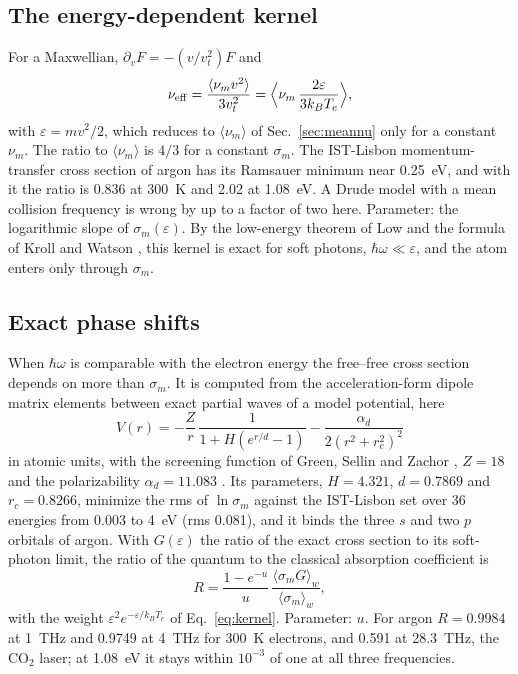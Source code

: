 \documentclass[11pt]{article}
\numberwithin{equation}{section}
\newcommand{\kB}{k_B}
\newcommand{\nueff}{\nu_{\rm eff}}
\begin{document}
\subsection{The energy-dependent kernel}
\label{sec:kernel}
For a Maxwellian, $\partial_vF=-(v/v_t^2)F$ and
\begin{equation}
\nueff=\frac{\langle\nu_mv^2\rangle}{3v_t^2}=\Big\langle\nu_m\,\frac{2\varepsilon}{3\kB T_e}\Big\rangle,
\label{eq:kernel}
\end{equation}
with $\varepsilon=mv^2/2$, which reduces to $\langle\nu_m\rangle$ of Sec.~\ref{sec:meannu} only for a constant $\nu_m$. The ratio to $\langle\nu_m\rangle$ is
$4/3$ for a constant $\sigma_m$. The IST-Lisbon momentum-transfer cross section of argon
\cite{Alves2014,Yamabe1983,Pitchford2016} has its Ramsauer minimum near 0.25~eV, and with it the
ratio is 0.836 at 300~K and 2.02 at 1.08~eV. A Drude model with a mean collision frequency
is wrong by up to a factor of two here. Parameter: the logarithmic slope of $\sigma_m(\varepsilon)$.
By the low-energy theorem of Low \cite{Low1958} and the formula of Kroll and Watson
\cite{KrollWatson1973}, this kernel is exact for soft photons, $\hbar\omega\ll\varepsilon$, and
the atom enters only through $\sigma_m$.

\subsection{Exact phase shifts}
\label{sec:phases}
When $\hbar\omega$ is comparable with the electron energy the free--free cross section depends
on more than $\sigma_m$. It is computed from the acceleration-form dipole matrix elements
between exact partial waves of a model potential, here
\begin{equation}
V(r)=-\frac{Z}{r}\,\frac{1}{1+H(e^{r/d}-1)}-\frac{\alpha_d}{2(r^2+r_c^2)^2}
\label{eq:model}
\end{equation}
in atomic units, with the screening function of Green, Sellin and Zachor \cite{GSZ1969},
$Z=18$ and the polarizability $\alpha_d=11.083$ \cite{Schwerdtfeger2019}. Its parameters,
$H=4.321$, $d=0.7869$ and $r_c=0.8266$, minimize the rms of $\ln\sigma_m$ against the IST-Lisbon
set over 36 energies from 0.003 to 4~eV (rms 0.081), and it binds the three $s$ and two $p$
orbitals of argon. With $G(\varepsilon)$ the ratio of the exact cross section to its soft-photon
limit, the ratio of the quantum to the classical absorption coefficient is
\begin{equation}
R=\frac{1-e^{-u}}{u}\,\frac{\langle\sigma_mG\rangle_w}{\langle\sigma_m\rangle_w},
\label{eq:R}
\end{equation}
with the weight $\varepsilon^2e^{-\varepsilon/\kB T_e}$ of Eq.~\eqref{eq:kernel}. Parameter: $u$. For
argon $R=0.9984$ at 1~THz and 0.9749 at 4~THz for 300~K electrons, and 0.591 at 28.3~THz, the
CO$_2$ laser; at 1.08~eV it stays within $10^{-3}$ of one at all three frequencies.
\end{document}
